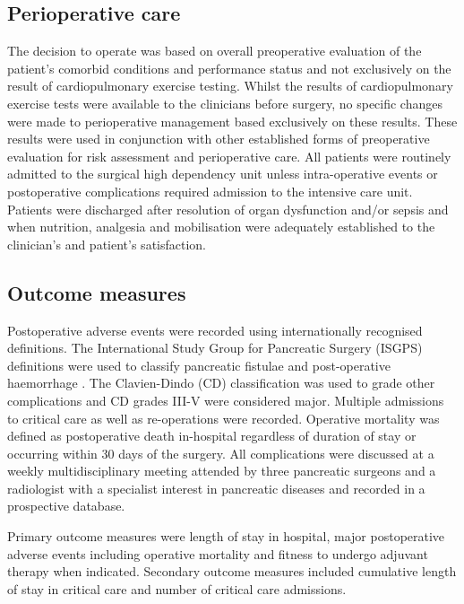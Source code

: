 \subsection{Perioperative care}
The decision to operate was based on overall preoperative evaluation of the patient's comorbid conditions and performance status and not exclusively on the result of cardiopulmonary exercise testing. 
Whilst the results of cardiopulmonary exercise tests were available to the clinicians before surgery, no specific changes were made to perioperative management based exclusively on these results. 
These results were used in conjunction with other established forms of preoperative evaluation for risk assessment and perioperative care. 
All patients were routinely admitted to the surgical high dependency unit unless intra-operative events or postoperative complications required admission to the intensive care unit. 
Patients were discharged after resolution of organ dysfunction and/or sepsis and when nutrition, analgesia and mobilisation were adequately established to the clinician's and patient's satisfaction.

\subsection{Outcome measures}
Postoperative adverse events were recorded using internationally recognised definitions. 
The International Study Group for Pancreatic Surgery (ISGPS) definitions were used to classify pancreatic fistulae \parencite{bassi_postoperative_2005} and post-operative haemorrhage \parencite{wente_postpancreatectomy_2007}. 
The Clavien-Dindo (CD) classification \parencite{clavien_clavien-dindo_2009, dindo_classification_2004} was used to grade other complications and CD grades III-V were considered major. 
Multiple admissions to critical care as well as re-operations were recorded. 
Operative mortality was defined as postoperative death in-hospital regardless of duration of stay or occurring within 30 days of the surgery. 
All complications were discussed at a weekly multidisciplinary meeting attended by three pancreatic surgeons and a radiologist with a specialist interest in pancreatic diseases and recorded in a prospective database.

Primary outcome measures were length of stay in hospital, major postoperative adverse events including operative mortality and fitness to undergo adjuvant therapy when indicated. 
Secondary outcome measures included cumulative length of stay in critical care and number of critical care admissions.

